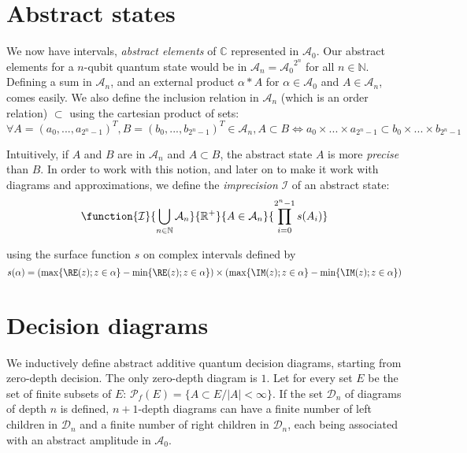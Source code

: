 \section{Abstract states}

We now have intervals, \textit{abstract elements} of $\mathbb{C}$ represented in $\mathcal{A}_0$. Our abstract elements for a $n$-qubit quantum state would be in $\mathcal{A}_n = {\mathcal{A}_0}^{2^n}$ for all $n \in \mathbb{N}$. Defining a sum in $\mathcal{A}_n$, and an external product $\alpha * A$ for
$\alpha \in \mathcal{A}_0$ and $A \in \mathcal{A}_n$, comes easily. We also define the inclusion relation in $\mathcal{A}_n$ (which is an order relation) $\subset$ using the cartesian product of sets:
$$\forall A = (a_0, ..., a_{2^n-1})^{T},  B = (b_0, ..., b_{2^n-1})^{T} \in \mathcal{A}_n, A \subset B \iff a_0 \times ... \times a_{2^n-1} \subset b_0 \times ... \times b_{2^n-1}$$

Intuitively, if $A$ and $B$ are in $\mathcal{A}_n$ and $A \subset B$, the abstract state $A$ is more \textit{precise} than $B$. In order to work with this notion, and later on to make it work with diagrams and approximations, we define the \textit{imprecision} $\mathcal{I}$ of an abstract state:
$$\function{\mathcal{I}}
{\bigcup_{n \in \mathbb{N}} \mathcal{A}_n}{\mathbb{R}^+}
{A \in \mathcal{A}_n}{\displaystyle\prod_{i = 0}^{2^n-1} s(A_i)}$$

\noindent using the surface function $s$ on complex intervals defined by
$$s(\alpha) = (\max\{\RE(z) ; z \in \alpha\} - \min\{\RE(z) ; z \in \alpha\}) \times (\max\{\IM(z) ; z \in \alpha\} - \min\{\IM(z) ; z \in \alpha\})$$

\section{Decision diagrams}

We inductively define abstract additive quantum decision diagrams, starting from zero-depth decision. The only zero-depth diagram is $\boxed{1}$. Let for every set $E$ be the set of finite subsets of $E$: $\mathscr{P}_f(E) = \{ A \subset E / |A| < \infty \}$. If the set $\mathcal{D}_n$ of diagrams of depth $n$ is defined, $n+1$-depth diagrams can have a finite number of left children in $\mathcal{D}_n$ and a finite number of right children in $\mathcal{D}_n$, each being associated with an abstract amplitude in $\mathcal{A}_0$.

